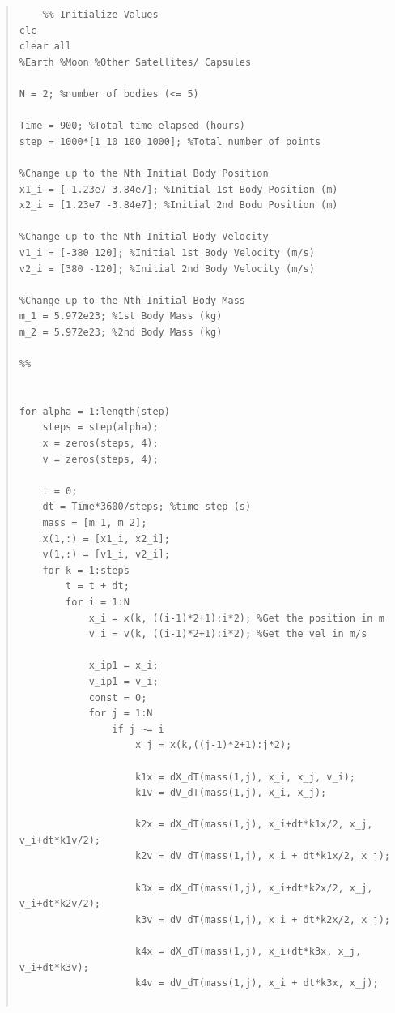 \documentclass[conf]{new-aiaa}
\begin{document}

\pagebreak
\begin{quote}
    \begin{lstlisting}
    %% Initialize Values
clc
clear all
%Earth %Moon %Other Satellites/ Capsules

N = 2; %number of bodies (<= 5)

Time = 900; %Total time elapsed (hours)
step = 1000*[1 10 100 1000]; %Total number of points

%Change up to the Nth Initial Body Position
x1_i = [-1.23e7 3.84e7]; %Initial 1st Body Position (m)
x2_i = [1.23e7 -3.84e7]; %Initial 2nd Bodu Position (m)

%Change up to the Nth Initial Body Velocity
v1_i = [-380 120]; %Initial 1st Body Velocity (m/s)
v2_i = [380 -120]; %Initial 2nd Body Velocity (m/s)

%Change up to the Nth Initial Body Mass
m_1 = 5.972e23; %1st Body Mass (kg)
m_2 = 5.972e23; %2nd Body Mass (kg)

%%


for alpha = 1:length(step)
    steps = step(alpha);
    x = zeros(steps, 4);
    v = zeros(steps, 4);
    
    t = 0;
    dt = Time*3600/steps; %time step (s)
    mass = [m_1, m_2];
    x(1,:) = [x1_i, x2_i];
    v(1,:) = [v1_i, v2_i];
    for k = 1:steps
        t = t + dt;
        for i = 1:N
            x_i = x(k, ((i-1)*2+1):i*2); %Get the position in m
            v_i = v(k, ((i-1)*2+1):i*2); %Get the vel in m/s

            x_ip1 = x_i;
            v_ip1 = v_i;
            const = 0;
            for j = 1:N
                if j ~= i
                    x_j = x(k,((j-1)*2+1):j*2);
                    
                    k1x = dX_dT(mass(1,j), x_i, x_j, v_i);
                    k1v = dV_dT(mass(1,j), x_i, x_j);
                    
                    k2x = dX_dT(mass(1,j), x_i+dt*k1x/2, x_j, v_i+dt*k1v/2);
                    k2v = dV_dT(mass(1,j), x_i + dt*k1x/2, x_j);
                    
                    k3x = dX_dT(mass(1,j), x_i+dt*k2x/2, x_j, v_i+dt*k2v/2);
                    k3v = dV_dT(mass(1,j), x_i + dt*k2x/2, x_j);
                    
                    k4x = dX_dT(mass(1,j), x_i+dt*k3x, x_j, v_i+dt*k3v);
                    k4v = dV_dT(mass(1,j), x_i + dt*k3x, x_j);


\end{lstlisting}
\end{quote}
\end{document}
